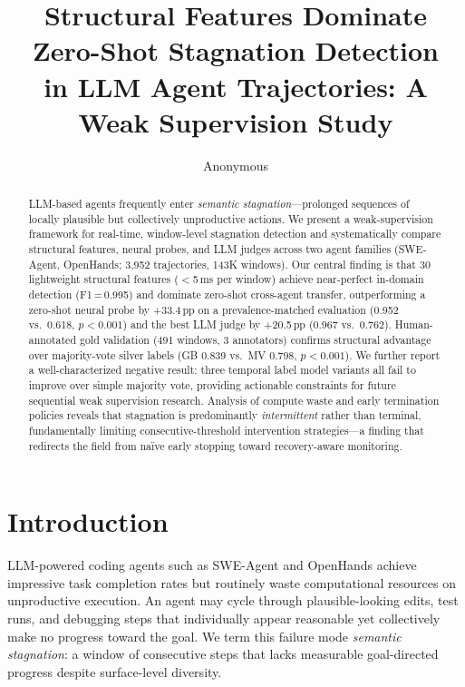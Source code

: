 \documentclass[11pt,a4paper]{article}
\title{Structural Features Dominate Zero-Shot Stagnation Detection\\in LLM Agent Trajectories: A Weak Supervision Study}
\author{Anonymous}
\begin{document}
\maketitle

\begin{abstract}
LLM-based agents frequently enter \emph{semantic stagnation}---prolonged sequences of locally plausible but collectively unproductive actions.
We present a weak-supervision framework for real-time, window-level stagnation detection and systematically compare structural features, neural probes, and LLM judges across two agent families (SWE-Agent, OpenHands; 3{,}952 trajectories, 143K windows).
Our central finding is that 30 lightweight structural features ($<$5\,ms per window) achieve near-perfect in-domain detection (F1\,=\,0.995) and dominate zero-shot cross-agent transfer, outperforming a zero-shot neural probe by +33.4\,pp on a prevalence-matched evaluation (0.952 vs.\ 0.618, $p<0.001$) and the best LLM judge by +20.5\,pp (0.967 vs.\ 0.762).
Human-annotated gold validation (491 windows, 3 annotators) confirms structural advantage over majority-vote silver labels (GB 0.839 vs.\ MV 0.798, $p<0.001$).
We further report a well-characterized negative result: three temporal label model variants all fail to improve over simple majority vote, providing actionable constraints for future sequential weak supervision research.
Analysis of compute waste and early termination policies reveals that stagnation is predominantly \emph{intermittent} rather than terminal, fundamentally limiting consecutive-threshold intervention strategies---a finding that redirects the field from na\"ive early stopping toward recovery-aware monitoring.
\end{abstract}

\section{Introduction}
\label{sec:intro}

LLM-powered coding agents such as SWE-Agent \cite{yang2024sweagent} and OpenHands \cite{wang2024openhands} achieve impressive task completion rates but routinely waste computational resources on unproductive execution.
An agent may cycle through plausible-looking edits, test runs, and debugging steps that individually appear reasonable yet collectively make no progress toward the goal.
We term this failure mode \emph{semantic stagnation}: a window of consecutive steps that lacks measurable goal-directed progress despite surface-level diversity.
\end{document}
